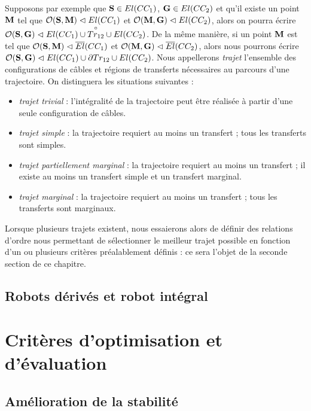 Supposons par exemple que ${\bf S} \in El(CC_1)$, ${\bf G} \in El(CC_2)$ et qu'il existe un point ${\bf M}$ tel que $\mathcal O({\bf S}, {\bf M}) \vartriangleleft
El(CC_1)$ et $\mathcal O({\bf M}, {\bf G}) \vartriangleleft El(CC_2)$, alors on pourra écrire $\mathcal O({\bf S}, {\bf G}) \vartriangleleft El(CC_1) \cup \overset{\circ}{Tr_{12}} \cup El(CC_2)$. De la même manière, si un point ${\bf M}$ est tel que $\mathcal O({\bf S}, {\bf M}) \vartriangleleft
\overline{El}(CC_1)$ et $\mathcal O({\bf M}, {\bf G}) \vartriangleleft \overline{El}(CC_2)$, alors nous pourrons écrire $\mathcal O({\bf S}, {\bf G}) \vartriangleleft El(CC_1) \cup \partial Tr_{12} \cup El(CC_2)$. Nous appellerons {\it trajet} l'ensemble des configurations de c\^ables et régions de transferts nécessaires au parcours d'une trajectoire. On distinguera les situations suivantes :
\begin{itemize}
 \item {\it trajet trivial} : l'intégralité de la trajectoire peut être réalisée à partir d'une seule configuration de câbles.
 \item {\it trajet simple} : la trajectoire requiert au moins un transfert ; tous les transferts sont simples.
 \item {\it trajet partiellement marginal} : la trajectoire requiert au moins un transfert ; il existe au moins un transfert simple et un transfert marginal.
 \item {\it trajet marginal} : la trajectoire requiert au moins un transfert ; tous les transferts sont marginaux.
\end{itemize}

Lorsque plusieurs trajets existent, nous essaierons alors de définir des relations d'ordre nous permettant de sélectionner le meilleur trajet possible en fonction d'un ou plusieurs critères préalablement définis : ce sera l'objet de la seconde section de ce chapitre.

\subsection{Robots d\'eriv\'es et robot int\'egral}




\section{Crit\`eres d'optimisation et d'\'evaluation}

\subsection{Am\'elioration de la stabilit\'e}

